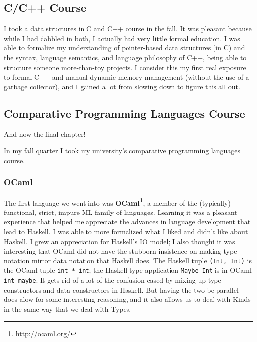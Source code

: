 \documentclass[]{article}
\renewcommand{\href}[2]{#2\footnote{\url{#1}}}
\begin{document}
\hypertarget{cc-course}{%
\subsection{C/C++ Course}\label{cc-course}}

I took a data structures in C and C++ course in the fall. It was pleasant
because while I had dabbled in both, I actually had very little formal
education. I was able to formalize my understanding of pointer-based data
structures (in C) and the syntax, language semantics, and language philosophy of
C++, being able to structure someone more-than-toy projects. I consider this my
first real exposure to formal C++ and manual dynamic memory management (without
the use of a garbage collector), and I gained a lot from slowing down to figure
this all out.

\hypertarget{comparative-programming-languages-course}{%
\subsection{Comparative Programming Languages
Course}\label{comparative-programming-languages-course}}

And now the final chapter!

In my fall quarter I took my university's comparative programming languages
course.

\hypertarget{ocaml}{%
\subsubsection{OCaml}\label{ocaml}}

The first language we went into was \textbf{\href{http://ocaml.org/}{OCaml}}, a
member of the (typically) functional, strict, impure ML family of languages.
Learning it was a pleasant experience that helped me appreciate the advances in
language development that lead to Haskell. I was able to more formalized what I
liked and didn't like about Haskell. I grew an appreciation for Haskell's IO
model; I also thought it was interesting that OCaml did not have the stubborn
insistence on making type notation mirror data notation that Haskell does. The
Haskell tuple \texttt{(Int,\ Int)} is the OCaml tuple \texttt{int\ *\ int}; the
Haskell type application \texttt{Maybe\ Int} is in OCaml \texttt{int\ maybe}. It
gets rid of a lot of the confusion cased by mixing up type constructors and data
constructors in Haskell. But having the two be parallel does alow for some
interesting reasoning, and it also allows us to deal with Kinds in the same way
that we deal with Types.
\end{document}
